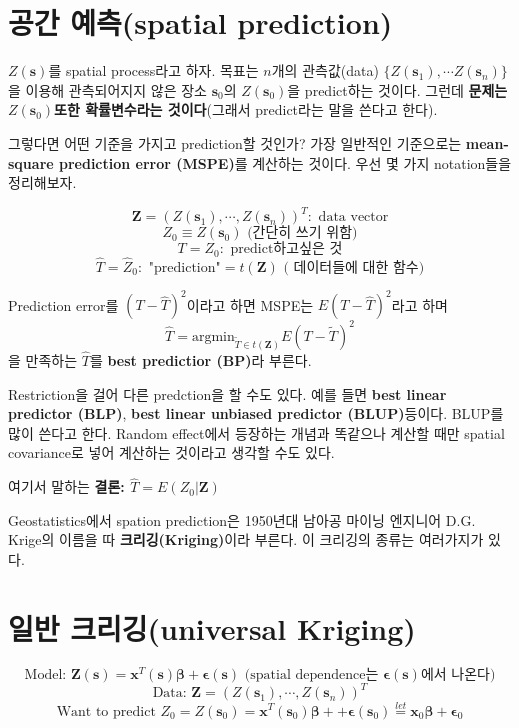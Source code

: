 \documentclass[b5paper,]{scrbook}
\theoremstyle{plain}
\theoremstyle{definition}
\numberwithin{equation}{section}
\begin{document}
\hypertarget{-spatial-prediction}{%
\section{공간 예측(spatial prediction)}\label{-spatial-prediction}}

\(Z(\mathbf{s})\)를 spatial process라고 하자. 목표는 \(n\)개의 관측값(data) \(\{ Z(\mathbf{s}_{1}), \cdots Z(\mathbf{s}_{n}) \}\)을 이용해 관측되어지지 않은 장소 \(\mathbf{s}_{0}\)의 \(Z(\mathbf{s}_{0})\)을 predict하는 것이다. 그런데 \textbf{문제는 \(Z(\mathbf{s}_{0})\)또한 확률변수라는 것이다}(그래서 predict라는 말을 쓴다고 한다).

그렇다면 어떤 기준을 가지고 prediction할 것인가? 가장 일반적인 기준으로는 \textbf{mean-square prediction error (MSPE)}를 계산하는 것이다. 우선 몇 가지 notation들을 정리해보자.

\[\mathbf{Z}=(Z(\mathbf{s}_{1}), \cdots , Z(\mathbf{s}_{n}))^{T}: \text{ data vector}\]
\[Z_{0}\equiv Z(\mathbf{s}_{0}) \text{ (간단히 쓰기 위함)}\]
\[T=Z_{0}: \text{ predict하고싶은 것}\]
\[\hat{T}=\hat{Z}_{0}: \text{ "prediction"}=t(\mathbf{Z}) \text{ ( 데이터들에 대한 함수)}\]

Prediction error를 \((T-\hat{T})^{2}\)이라고 하면 MSPE는 \(E(T-\hat{T})^{2}\)라고 하며
\[\hat{T}=\text{argmin}_{\tilde{T}\in t(\mathbf{Z})}E(T-\tilde{T})^{2}\]
을 만족하는 \(\hat{T}\)를 \textbf{best predictior (BP)}라 부른다.

Restriction을 걸어 다른 predction을 할 수도 있다. 예를 들면 \textbf{best linear predictor (BLP)}, \textbf{best linear unbiased predictor (BLUP)}등이다. BLUP를 많이 쓴다고 한다. Random effect에서 등장하는 개념과 똑같으나 계산할 때만 spatial covariance로 넣어 계산하는 것이라고 생각할 수도 있다.

여기서 말하는 \textbf{결론: \(\hat{T}=E(Z_{0}|\mathbf{Z})\)}

Geostatistics에서 spation prediction은 1950년대 남아공 마이닝 엔지니어 D.G. Krige의 이름을 따 \textbf{크리깅(Kriging)}이라 부른다. 이 크리깅의 종류는 여러가지가 있다.

\hypertarget{-universal-kriging}{%
\section{일반 크리깅(universal Kriging)}\label{-universal-kriging}}

\[\text{Model: } \mathbf{Z}(\mathbf{s})=\mathbf{x}^{T}(\mathbf{s})\boldsymbol{\beta}+\boldsymbol{\epsilon}(\mathbf{s}) \text{ (spatial dependence는 } \boldsymbol{\epsilon}(\mathbf{s})\text{에서 나온다)}\]
\[\text{Data: } \mathbf{Z}=(Z(\mathbf{s}_{1}), \cdots , Z(\mathbf{s}_{n}))^{T}\]
\[\text{Want to predict } Z_{0}=Z(\mathbf{s}_{0})=\mathbf{x}^{T}(\mathbf{s}_{0})\boldsymbol{\beta}+\mathbf+\boldsymbol{\epsilon}(\mathbf{s}_{0})\stackrel{let}{=}\mathbf{x}_{0}\boldsymbol{\beta}+\boldsymbol{\epsilon}_{0}\]
\end{document}
